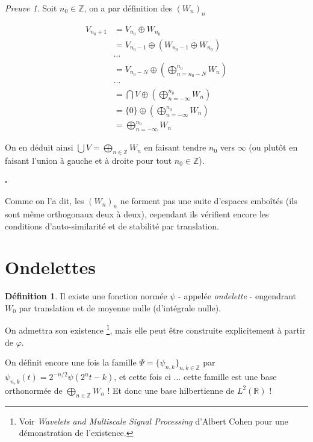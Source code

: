 \documentclass[]{article}
\theoremstyle{remark}
\newtheorem{myproof}{Preuve}
\theoremstyle{definition}
\newtheorem{mydef}{Définition}
\newcommand{\cqfd}{
	\hfill$\square$
}
\newcommand{\DS}{\displaystyle}
\begin{document}
	\begin{myproof}
		Soit $n_0 \in \mathbb{Z}$, on a par définition des $(W_{n})_n$
		
		\begin{align*}
			V_{n_0+1} &= V_{n_0} \oplus W_{n_0} \\
			&= V_{n_0 - 1} \oplus \left(W_{n_0 - 1} \oplus W_{n_0} \right) \\
			& \cdots \\
			&= V_{n_0 - N} \oplus \left(\bigoplus_{n = n_0 - N}^{n_0} W_n \right) \\
			& \cdots \\
			&= \bigcap V \oplus \left(\bigoplus_{n = - \infty}^{n_0} W_n \right) \\
			&= \{0\} \oplus \left(\bigoplus_{n = - \infty}^{n_0} W_n \right) \\
			&= \bigoplus_{n = - \infty}^{n_0} W_n
		\end{align*}
		
		On en déduit ainsi $\DS \bigcup V = \bigoplus_{n \in \mathbb{Z}} W_n$ en faisant tendre $n_0$ vers $\infty$ (ou plutôt en faisant l'union à gauche et à droite pour tout $n_0 \in \mathbb{Z}$).
		
		\cqfd
	\end{myproof}
	
	Comme on l'a dit, les $(W_n)_n$ ne forment pas une suite d'espaces emboîtés (ils sont même orthogonaux deux à deux), cependant ils vérifient encore les conditions d'auto-similarité et de stabilité par translation.

	\section{Ondelettes}

	\begin{mydef}
		Il existe une fonction normée $\psi$ - appelée \textit{ondelette} - engendrant $W_0$ par translation et de moyenne nulle (d'intégrale nulle).
		
		On admettra son existence \footnote{Voir \textit{Wavelets and Multiscale Signal Processing} d'Albert Cohen pour une démonstration de l'existence.}, mais elle peut être construite explicitement à partir de $\varphi$.
	\end{mydef}
		
	On définit encore une fois la famille $\Psi = \{\psi_{n, k}\}_{n, k \in \mathbb{Z}}$ par $\psi_{n, k}(t) = 2^{-n/2} \psi(2^{n} t - k)$, et cette fois ci ... cette famille est une base orthonormée de $\DS \bigoplus_{n \in \mathbb{Z}} W_n$ ! Et donc une base hilbertienne de $L^2(\mathbb{R})$ !
	
\end{document}
